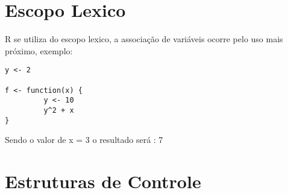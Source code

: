 \documentclass[12pt]{article}
\begin{document}
\section{Escopo Lexico} \label{sec:Escopo Lexico}
    R se utiliza do escopo lexico, a associação de variáveis ocorre pelo uso mais próximo, exemplo:
    \begin{verbatim}
y <- 2
 
f <- function(x) {
         y <- 10
         y^2 + x
}
    \end{verbatim}
Sendo o valor de x = 3 o resultado será : 7 

\section{Estruturas de Controle} \label{sec:Comandos de Execução}
\end{document}
